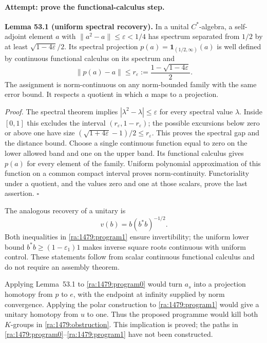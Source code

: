\documentclass[11pt]{article}
\begin{document}
\paragraph{Attempt: prove the functional-calculus step.}
\textbf{Lemma 53.1 (uniform spectral recovery).} In a unital
$C^*$-algebra, a self-adjoint element $a$ with
$\|a^2-a\|\le\varepsilon<1/4$ has spectrum separated from $1/2$ by at
least $\sqrt{1-4\varepsilon}/2$. Its spectral projection
$p(a)=\mathbf1_{(1/2,\infty)}(a)$ is well defined by continuous
functional calculus on its spectrum and
\begin{equation}\label{ra:1479:recovery}
 \|p(a)-a\|\le
 r_\varepsilon:=\frac{1-\sqrt{1-4\varepsilon}}2.
\end{equation}
The assignment is norm-continuous on any norm-bounded family with the
same error bound. It respects a quotient in which $a$ maps to a projection.

\textit{Proof.} The spectral theorem implies
$|\lambda^2-\lambda|\le\varepsilon$ for every spectral value $\lambda$.
Inside $[0,1]$ this excludes the interval
$(r_\varepsilon,1-r_\varepsilon)$; the possible excursions below zero
or above one have size
$(\sqrt{1+4\varepsilon}-1)/2\le r_\varepsilon$.
This proves the spectral gap and the distance bound. Choose a single
continuous function equal to zero on the lower allowed band and one on
the upper band. Its functional calculus gives $p(a)$ for every element
of the family. Uniform polynomial approximation of this function on a
common compact interval proves norm-continuity. Functoriality under a
quotient, and the values zero and one at those scalars, prove the last
assertion. \hfill$\square$

The analogous recovery of a unitary is
\[
 v(b)=b(b^*b)^{-1/2}.
\]
Both inequalities in \eqref{ra:1479:program1} ensure invertibility; the
uniform lower bound $b^*b\ge(1-\varepsilon_1)1$ makes inverse square roots
continuous with uniform control. These statements follow from scalar
continuous functional calculus and do not require an assembly theorem.

Applying Lemma~53.1 to \eqref{ra:1479:program0} would turn $a_s$ into a
projection homotopy from $p$ to $e$, with the endpoint at infinity supplied
by norm convergence. Applying the polar construction to
\eqref{ra:1479:program1} would give a unitary homotopy from $u$ to one.
Thus the proposed programme would kill both $K$-groups in
\eqref{ra:1479:obstruction}. This implication is proved; the paths in
\eqref{ra:1479:program0}--\eqref{ra:1479:program1} have not been constructed.
\end{document}

